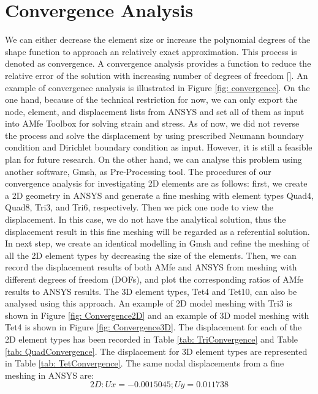 \section{Convergence Analysis}
We can either decrease the element size or increase the polynomial degrees of the shape function to approach an relatively exact approximation. This process is denoted as convergence. A convergence analysis provides a function to reduce the relative error of the solution with increasing number of degrees of freedom [\cite{FiniteElement}]. An example of convergence analysis is illustrated in Figure \ref{fig: convergence}. On the one hand, because of the technical restriction for now, we can only export the node, element, and displacement lists from ANSYS and set all of them as input into AMfe Toolbox for solving strain and stress. As of now, we did not reverse the process and solve the displacement by using prescribed Neumann boundary condition and Dirichlet boundary condition as input. However, it is still a feasible plan for future research. On the other hand, we can analyse this problem using another software, Gmsh, as Pre-Processing tool. The procedures of our convergence analysis for investigating 2D elements are as follows: first, we create a 2D geometry in ANSYS and generate a fine meshing with element types Quad4, Quad8, Tri3, and Tri6, respectively. Then we pick one node to view the displacement. In this case, we do not have the analytical solution, thus the displacement result in this fine meshing will be regarded as a referential solution. In next step, we create an identical modelling in Gmsh and refine the meshing of all the 2D element types by decreasing the size of the elements. Then, we can record the displacement results of both AMfe and ANSYS from meshing with different degrees of freedom (DOFs), and plot the corresponding ratios of AMfe results to ANSYS results. The 3D element types, Tet4 and Tet10, can also be analysed using this approach. An example of 2D model meshing with Tri3 is shown in Figure \ref{fig: Convergence2D} and an example of 3D model meshing with Tet4 is shown in Figure \ref{fig: Convergence3D}.
The displacement for each of the 2D element types has been recorded in Table \ref{tab: TriConvergence} and Table \ref{tab: QuadConvergence}. The displacement for 3D element types are represented in Table \ref{tab: TetConvergence}. The same nodal displacements from a fine meshing in ANSYS are:
\begin{equation*}
2D: Ux = -0.0015045; Uy = 0.011738
\end{equation*}

